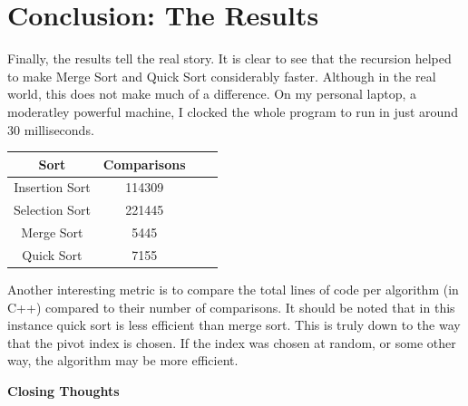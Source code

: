 \documentclass[letterpaper, 10pt]{article}
\begin{document}
\section{Conclusion: The Results}

Finally, the results tell the real story. It is clear to see that the recursion helped to make Merge Sort and Quick Sort considerably faster. Although in the real world, this does not make much of a difference. On my personal laptop, a moderatley powerful machine, I clocked the whole program to run in just around 30 milliseconds.

\begin{center}
{
 \begin{tabular}{||c c c c||} 
 \hline
 Sort & Comparisons \\ [0.5ex] 
 \hline\hline
 Insertion Sort& 114309 \\ 
 \hline
 Selection Sort& 221445 \\
 \hline
 Merge Sort& 5445 \\
 \hline
 Quick Sort& 7155 \\ [1ex] 
 \hline
\end{tabular}
}
\end{center}

Another interesting metric is to compare the total lines of code per algorithm (in C++) compared to their number of comparisons. It should be noted that in this instance quick sort is less efficient than merge sort. This is truly down to the way that the pivot index is chosen. If the index was chosen at random, or some other way, the algorithm may be more efficient.


\begin{center}
\end{center}
\newpage
\textbf{Closing Thoughts}
\end{document}
